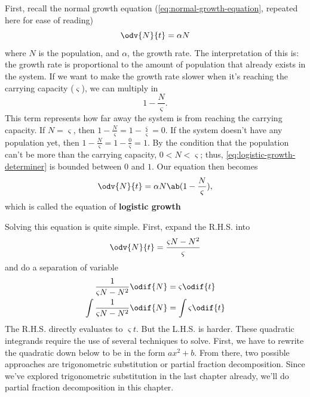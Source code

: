 First, recall the normal growth equation (\cref{eq:normal-growth-equation}, repeated here for ease of reading)
\begin{equation*}
	\odv{N}{t} = \alpha N
\end{equation*}
where $N$ is the population, and $\alpha$, the growth rate. The interpretation of this is: the growth rate is proportional to the amount of population that already exists in the system. If we want to make the growth rate slower when it's reaching the carrying capacity ($\varsigma$), we can multiply in
\begin{equation}
	1 - \frac{N}{\varsigma}. \label{eq:logistic-growth-determiner}
\end{equation}
This term represents how far away the system is from reaching the carrying capacity. If $N = \varsigma$, then $1 - \frac{N}{\varsigma} = 1 - \frac{\varsigma}{\varsigma} = 0$. If the system doesn't have any population yet, then $1 - \frac{N}{\varsigma} = 1 - \frac{0}{\varsigma} = 1$. By the condition that the population can't be more than the carrying capacity, $0 < N < \varsigma$; thus, \cref{eq:logistic-growth-determiner} is bounded between $0$ and $1$. Our equation then becomes
\begin{equation}
	\odv{N}{t} = \alpha N\ab(1 - \frac{N}{\varsigma}),
\end{equation}
which is called the equation of \textbf{logistic growth} 

Solving this equation is quite simple. First, expand the R.H.S. into
\begin{equation}
	\odv{N}{t} = \frac{\varsigma N - N^2}{\varsigma}
\end{equation}
and do a separation of variable
\begin{align}
	\frac{1}{\varsigma N - N^2}\odif{N}      & = \varsigma\odif{t}                                    \\
	\int \frac{1}{\varsigma N - N^2}\odif{N} & = \int \varsigma\odif{t} \label{eq:logistic-equations}
\end{align}
The R.H.S. directly evaluates to $\varsigma t$. But the L.H.S. is harder. These quadratic integrands require the use of several techniques to solve. First, we have to rewrite the quadratic down below to be in the form $ax^2 + b$. From there, two possible approaches are trigonometric substitution or partial fraction decomposition. Since we've explored trigonometric substitution in the last chapter already, we'll do partial fraction decomposition in this chapter.

